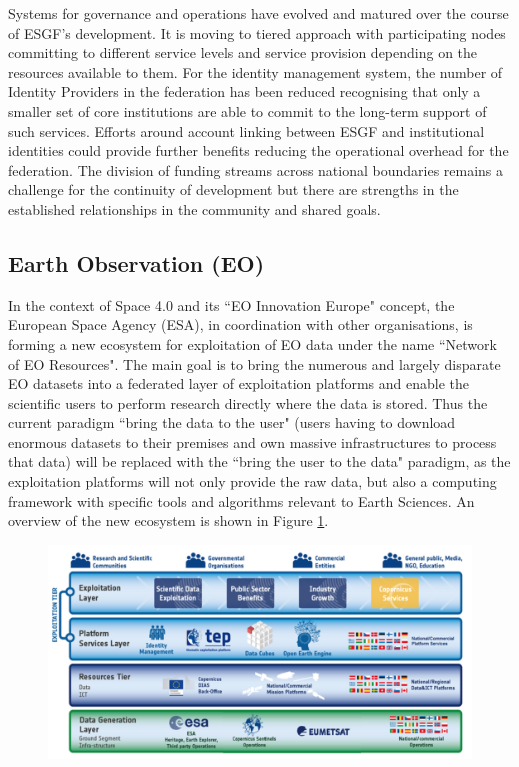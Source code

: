 \documentclass[fleqn,10pt]{wlscirep}
\begin{document}
{Systems for governance and operations have evolved and matured over the course of ESGF's development. It is moving to tiered approach with participating nodes committing to different service levels and service provision depending on the resources available to them. For the identity management system, the number of Identity Providers in the federation has been reduced recognising that only a smaller set of core institutions are able to commit to the long-term support of such services. Efforts around account linking between ESGF and institutional identities could provide further benefits reducing the operational overhead for the federation. The division of funding streams across national boundaries remains a challenge for the continuity of development but there are strengths in the established relationships in the community and shared goals.

\subsection{Earth Observation (EO)}

In the context of Space 4.0 and its ``EO Innovation Europe" concept, the European Space Agency (ESA), in coordination with other organisations, is forming a new ecosystem for exploitation of EO data under the name ``Network of EO Resources". The main goal is to bring the numerous and largely disparate EO datasets into a federated layer of exploitation platforms and enable the scientific users to perform research directly where the data is stored. Thus the current paradigm ``bring the data to the user" (users having to download enormous datasets to their premises and own massive infrastructures to process that data) will be replaced with the ``bring the user to the data" paradigm, as the exploitation platforms will not only provide the raw data, but also a computing framework with specific tools and algorithms relevant to Earth Sciences. An overview of the new ecosystem is shown in Figure \ref{fig:eo}.

\begin{figure}[ht!]
\centering
\includegraphics[width=0.7\columnwidth]{eo.png}
\caption{}
\label{fig:eo}
\end{figure}

}
\end{document}
